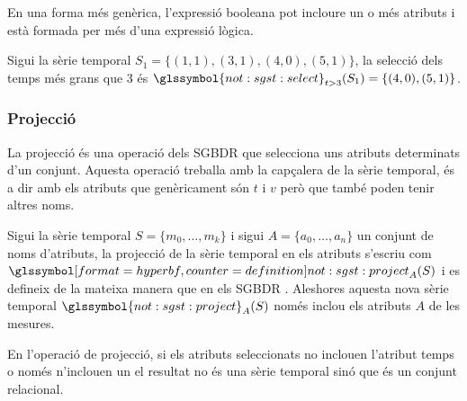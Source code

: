 En una forma més genèrica, l'expressió booleana pot incloure un o més
atributs i està formada per més d'una expressió lògica.


\begin{example}
  Sigui la sèrie temporal $S_1=\{(1,1),(3,1),(4,0),(5,1)\}$, la
  selecció dels temps més grans que $3$ és
  $\glssymbol{not:sgst:select}_{t>3}(S_1) = \{(4,0),(5,1)\}$.
\end{example}





\subsubsection{Projecció}


La projecció és una operació dels \gls{SGBDR} que selecciona uns
atributs determinats d'un conjunt. Aquesta operació treballa amb la
capçalera de la sèrie temporal, és a dir amb els atributs que
genèricament són $t$ i $v$ però que també poden tenir altres noms.

\begin{definition}[Projecció]
  Sigui la sèrie temporal $S=\{ m_0,\dotsc,m_k\}$ i sigui $A=\{a_0,
  \dotsc, a_n\}$ un conjunt de noms d'atributs, la projecció de la
  sèrie temporal en els atributs s'escriu com
  $\glssymboldef{not:sgst:project}_A(S)$ i es defineix de la mateixa
  manera que en els
  \gls{SGBDR} \parencite[cap.~7]{date04:introduction8}. Aleshores
  aquesta nova sèrie temporal $\glssymbol{not:sgst:project}_A(S)$
  només inclou els atributs $A$ de les mesures.
\end{definition}

En l'operació de projecció, si els
atributs seleccionats no inclouen l'atribut temps o només n'inclouen
un el resultat no és una sèrie temporal sinó que és un conjunt
relacional. 






